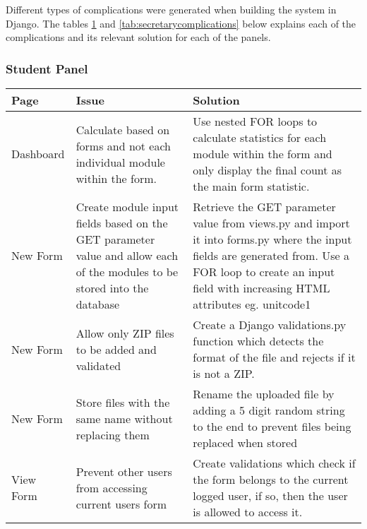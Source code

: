 \documentclass[../main.tex]{subfiles}
\begin{document}
\raggedright
Different types of complications were generated when building the system in Django. The tables \ref{tab:studentcomplications} and \ref{tab:secretarycomplications} below explains each of the complications and its relevant solution for each of the panels.

\subsubsection{Student Panel}
\def\arraystretch{1.2}%
\begin{table}[H]
\centering
\begin{tabular}{| l | p{6.5cm} | p{6.5cm} |}
\hline
\textbf{Page} & \textbf{Issue}                                                                                                           & \textbf{Solution}                                                                                                                                                                                           \\ \hline
Dashboard     & Calculate based on forms and not each individual module within the form.                                                 & Use nested FOR loops to calculate statistics for each module within the form and only display the final count as the main form statistic.                                                                   \\ \hline
New Form      & Create module input fields based on the GET parameter value and allow each of the modules to be stored into the database & Retrieve the GET parameter value from views.py and import it into forms.py where the input fields are generated from. Use a FOR loop to create an input field with increasing HTML attributes eg. unitcode1 \\ \hline
New Form      & Allow only ZIP files to be added and validated                                                                           & Create a Django validations.py function which detects the format of the file and rejects if it is not a ZIP.                                                                                                \\ \hline
New Form      & Store files with the same name without replacing them                                                                    & Rename the uploaded file by adding a 5 digit random string to the end to prevent files being replaced when stored                                                                                           \\ \hline
View Form     & Prevent other users from accessing current users form                                                                    & Create validations which check if the form belongs to the current logged user, if so, then the user is allowed to access it.                                                                                \\ \hline

\end{tabular}%
\label{tab:studentcomplications}
\end{table}
\end{document}

